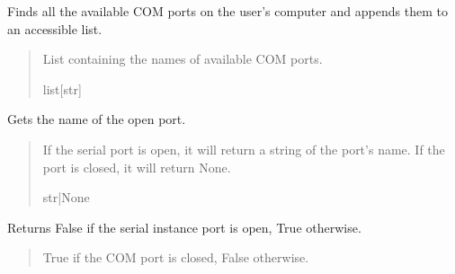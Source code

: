 \documentclass[letterpaper,10pt,english]{sphinxmanual}
\begin{document}
\begin{fulllineitems}
\begin{fulllineitems}
\label{\detokenize{SerialCommunication:SerialCommunication.COM_io.GetCOMportsList}}
\pysigstartsignatures
{}
\pysigstopsignatures
\sphinxAtStartPar
Finds all the available COM ports on the user’s computer and appends them to an         accessible list.
\begin{quote}\begin{description}
\sphinxAtStartPar
List containing the names of available COM ports.

\sphinxAtStartPar
list{[}str{]}

\end{description}\end{quote}

\end{fulllineitems}


\begin{fulllineitems}
\label{\detokenize{SerialCommunication:SerialCommunication.COM_io.GetPortName}}
\pysigstartsignatures
{}
\pysigstopsignatures
\sphinxAtStartPar
Gets the name of the open port.
\begin{quote}\begin{description}
\sphinxAtStartPar
If the serial port is open, it will return a string of the port’s name.                 If the port is closed, it will return None.

\sphinxAtStartPar
str|None

\end{description}\end{quote}

\end{fulllineitems}


\begin{fulllineitems}
\label{\detokenize{SerialCommunication:SerialCommunication.COM_io.IsSerialClosed}}
\pysigstartsignatures
{}
\pysigstopsignatures
\sphinxAtStartPar
Returns False if the serial instance port is open, True otherwise.
\begin{quote}\begin{description}
\sphinxAtStartPar
True if the COM port is closed, False otherwise.


\end{description}
\end{quote}
\end{fulllineitems}
\end{fulllineitems}
\end{document}
